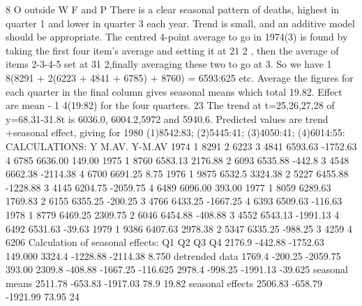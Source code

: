 8
O outside W F and P
There is a clear seasonal pattern of deaths, highest in quarter 1 and lower in quarter
3 each year. Trend is small, and an additive model should be appropriate.
The centred 4-point average to go in 1974(3) is found by taking the first four item’s
average and setting it at 21
2 , then the average of items 2-3-4-5 set at 31
2,finally averaging
these two to go at 3. So we have 1
8(8291 + 2(6223 + 4841 + 6785) + 8760) = 6593:625
etc. Average the figures for each quarter in the final column gives seasonal means which
total 19.82. Effect are mean - 1
4(19:82) for the four quarters.
23
The trend at t=25,26,27,28 of y=68.31-31.8t is 6036.0, 6004.2,5972 and 5940.6. Predicted
values are trend +seasonal effect, giving for
1980 (1)8542:83; (2)5445:41; (3)4050:41; (4)6014:55:
CALCULATIONS:
Y M.AV. Y-M.AV
1974 1 8291
2 6223
3 4841 6593.63 -1752.63
4 6785 6636.00 149.00
1975 1 8760 6583.13 2176.88
2 6093 6535.88 -442.8
3 4548 6662.38 -2114.38
4 6700 6691.25 8.75
1976 1 9875 6532.5 3324.38
2 5227 6455.88 -1228.88
3 4145 6204.75 -2059.75
4 6489 6096.00 393.00
1977 1 8059 6289.63 1769.83
2 6155 6355.25 -200.25
3 4766 6433.25 -1667.25
4 6393 6509.63 -116.63
1978 1 8779 6469.25 2309.75
2 6046 6454.88 -408.88
3 4552 6543.13 -1991.13
4 6492 6531.63 -39.63
1979 1 9386 6407.63 2978.38
2 5347 6335.25 -988.25
3 4259
4 6206
Calculation of seasonal effects:
Q1 Q2 Q3 Q4
2176.9 -442.88 -1752.63 149.000
3324.4 -1228.88 -2114.38 8.750
detrended data 1769.4 -200.25 -2059.75 393.00
2309.8 -408.88 -1667.25 -116.625
2978.4 -998.25 -1991.13 -39.625
seasonal means 2511.78 -653.83 -1917.03 78.9 19.82
seasonal effects 2506.83 -658.79 -1921.99 73.95
24